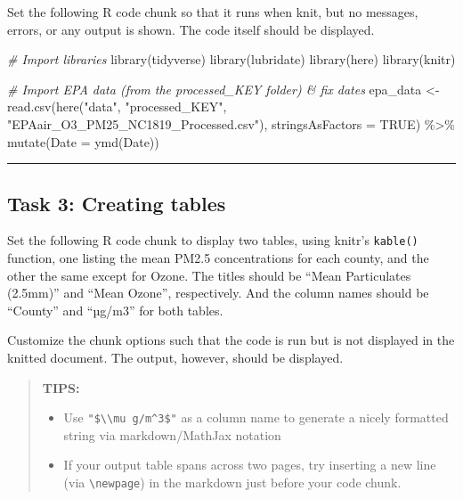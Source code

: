 \documentclass[
]{article}
\newenvironment{Shaded}{\begin{snugshade}}{\end{snugshade}}
\newcommand{\AttributeTok}[1]{\textcolor[rgb]{0.77,0.63,0.00}{#1}}
\newcommand{\CommentTok}[1]{\textcolor[rgb]{0.56,0.35,0.01}{\textit{#1}}}
\newcommand{\ConstantTok}[1]{\textcolor[rgb]{0.00,0.00,0.00}{#1}}
\newcommand{\FunctionTok}[1]{\textcolor[rgb]{0.00,0.00,0.00}{#1}}
\newcommand{\NormalTok}[1]{#1}
\newcommand{\OtherTok}[1]{\textcolor[rgb]{0.56,0.35,0.01}{#1}}
\newcommand{\SpecialCharTok}[1]{\textcolor[rgb]{0.00,0.00,0.00}{#1}}
\newcommand{\StringTok}[1]{\textcolor[rgb]{0.31,0.60,0.02}{#1}}
\begin{document}
Set the following R code chunk so that it runs when knit, but no
messages, errors, or any output is shown. The code itself should be
displayed.

\begin{Shaded}
\begin{Highlighting}[]
\CommentTok{\# Import libraries}
\FunctionTok{library}\NormalTok{(tidyverse)}
\FunctionTok{library}\NormalTok{(lubridate)}
\FunctionTok{library}\NormalTok{(here)}
\FunctionTok{library}\NormalTok{(knitr)}

\CommentTok{\# Import EPA data (from the processed\_KEY folder) \& fix dates}
\NormalTok{epa\_data }\OtherTok{\textless{}{-}} \FunctionTok{read.csv}\NormalTok{(}\FunctionTok{here}\NormalTok{(}\StringTok{"data"}\NormalTok{, }\StringTok{"processed\_KEY"}\NormalTok{, }\StringTok{"EPAair\_O3\_PM25\_NC1819\_Processed.csv"}\NormalTok{),}
    \AttributeTok{stringsAsFactors =} \ConstantTok{TRUE}\NormalTok{) }\SpecialCharTok{\%\textgreater{}\%}
    \FunctionTok{mutate}\NormalTok{(}\AttributeTok{Date =} \FunctionTok{ymd}\NormalTok{(Date))}
\end{Highlighting}
\end{Shaded}

\begin{center}\rule{0.5\linewidth}{0.5pt}\end{center}

\hypertarget{task-3-creating-tables}{%
\subsection{Task 3: Creating tables}\label{task-3-creating-tables}}

Set the following R code chunk to display two tables, using knitr's
\texttt{kable()} function, one listing the mean PM2.5 concentrations for
each county, and the other the same except for Ozone. The titles should
be ``Mean Particulates (2.5mm)'' and ``Mean Ozone'', respectively. And
the column names should be ``County'' and ``µg/m3'' for both tables.

Customize the chunk options such that the code is run but is not
displayed in the knitted document. The output, however, should be
displayed.

\begin{quote}
\textbf{TIPS:}

\begin{itemize}
\item
  Use \texttt{"\$\textbackslash{}\textbackslash{}mu\ g/m\^{}3\$"} as a
  column name to generate a nicely formatted string via markdown/MathJax
  notation
\item
  If your output table spans across two pages, try inserting a new line
  (via \texttt{\textbackslash{}newpage}) in the markdown just before
  your code chunk.
\end{itemize}
\end{quote}
\end{document}

